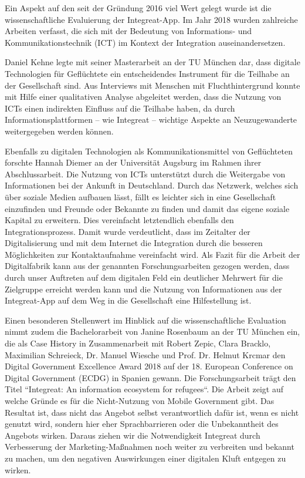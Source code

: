 \documentclass[12pt, a4paper]{article} %
\begin{document}
Ein Aspekt auf den seit der Gründung 2016 viel Wert gelegt wurde ist die
wissenschaftliche Evaluierung der Integreat-App. Im Jahr 2018 wurden
zahlreiche Arbeiten verfasst, die sich mit der Bedeutung von
Informations- und Kommunikationstechnik (ICT) im Kontext der Integration
auseinandersetzen.

Daniel Kehne legte mit seiner Masterarbeit an der TU München dar, dass
digitale Technologien für Geflüchtete ein entscheidendes Instrument für
die Teilhabe an der Gesellschaft sind. Aus Interviews mit Menschen mit
Fluchthintergrund konnte mit Hilfe einer qualitativen Analyse abgeleitet
werden, dass die Nutzung von ICTs einen indirekten Einfluss auf die
Teilhabe haben, da durch Informationsplattformen – wie Integreat –
wichtige Aspekte an Neuzugewanderte weitergegeben werden können.

Ebenfalls zu digitalen Technologien als Kommunikationsmittel von
Geflüchteten forschte Hannah Diemer an der Universität Augsburg im
Rahmen ihrer Abschlussarbeit. Die Nutzung von ICTs unterstützt durch die
Weitergabe von Informationen bei der Ankunft in Deutschland. Durch das
Netzwerk, welches sich über soziale Medien aufbauen lässt, fällt es
leichter sich in eine Gesellschaft einzufinden und Freunde oder Bekannte
zu finden und damit das eigene soziale Kapital zu erweitern. Dies
vereinfacht letztendlich ebenfalls den Integrationsprozess. Damit wurde
verdeutlicht, dass im Zeitalter der Digitalisierung und mit dem Internet
die Integration durch die besseren Möglichkeiten zur Kontaktaufnahme
vereinfacht wird. Als Fazit für die Arbeit der Digitalfabrik kann aus
der genannten Forschungsarbeiten gezogen werden, dass durch unser
Auftreten auf dem digitalen Feld ein deutlicher Mehrwert für die
Zielgruppe erreicht werden kann und die Nutzung von Informationen aus
der Integreat-App auf dem Weg in die Gesellschaft eine Hilfestellung
ist.

Einen besonderen Stellenwert im Hinblick auf die wissenschaftliche
Evaluation nimmt zudem die Bachelorarbeit von Janine Rosenbaum an der TU
München ein, die als Case History in Zusammenarbeit mit Robert Zepic,
Clara Bracklo, Maximilian Schreieck, Dr. Manuel Wiesche und Prof. Dr.
Helmut Krcmar den Digital Government Excellence Award 2018 auf der 18.
European Conference on Digital Government (ECDG) in Spanien gewann. Die
Forschungsarbeit trägt den Titel “Integreat: An information ecosystem
for refugees“. Die Arbeit zeigt auf welche Gründe es für die
Nicht-Nutzung von Mobile Government gibt. Das Resultat ist, dass nicht
das Angebot selbst verantwortlich dafür ist, wenn es nicht genutzt wird,
sondern hier eher Sprachbarrieren oder die Unbekanntheit des Angebots
wirken. Daraus ziehen wir die Notwendigkeit Integreat durch Verbesserung
der Marketing-Maßnahmen noch weiter zu verbreiten und bekannt zu machen,
um den negativen Auswirkungen einer digitalen Kluft entgegen zu wirken.
\end{document}
